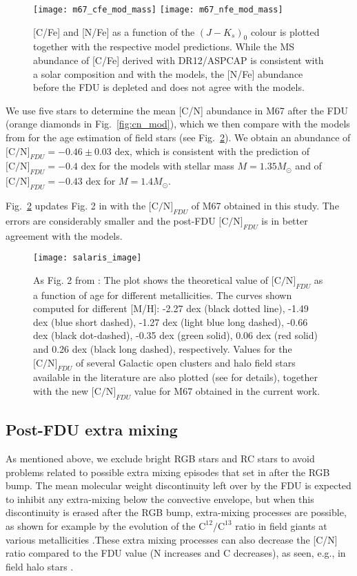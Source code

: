 \documentclass[a4paper,fleqn,usenatbib]{mnras}
\begin{document}
\begin{figure}
	\texttt{[image: m67\_cfe\_mod\_mass]}
	\texttt{[image: m67\_nfe\_mod\_mass]}
	\caption{[C/Fe] and [N/Fe] as a function of the $(J-K_s)_0$ colour is plotted together with the respective model predictions. While the MS abundance of [C/Fe] derived with DR12/ASPCAP is consistent with a solar composition and with the models, the [N/Fe] abundance before the FDU is depleted and does not agree with the models.}
	\label{fig:cn_mod_sep}
\end{figure}


We use five stars to determine the mean [C/N] abundance in M67 after the FDU (orange diamonds in Fig.~\ref{fig:cn_mod}), which we then compare with the models from \citet{salaris2015} for the age estimation of field stars (see Fig.~\ref{fig:sal_mod}). We obtain an abundance of $\text{[C/N]}_{FDU}=-0.46\pm 0.03$ dex, which is consistent with the prediction of $\text{[C/N]}_{FDU}=-0.4$ dex for the models with stellar mass $M=1.35M_{\odot}$ and of $\text{[C/N]}_{FDU}=-0.43$ dex for $M=1.4M_{\odot}$. 

Fig.~\ref{fig:sal_mod} updates Fig. 2 in \citet{salaris2015} with the $\text{[C/N]}_{FDU}$ of M67 obtained in this study. The errors are considerably smaller and the post-FDU $\text{[C/N]}_{FDU}$ is in better agreement with the models.

\begin{figure}
	\texttt{[image: salaris\_image]}
	\caption{As Fig. 2 from \citet{salaris2015}: The plot shows the theoretical value of $\text{[C/N]}_{FDU}$ as a function of age for different metallicities. The curves shown computed for different [M/H]: -2.27 dex (black dotted line), -1.49 dex (blue short dashed), -1.27 dex (light blue long dashed), -0.66 dex (black dot-dashed), -0.35 dex (green solid), 0.06 dex (red solid) and 0.26 dex (black long dashed), respectively. Values for the $\text{[C/N]}_{FDU}$ of several Galactic open clusters and halo field stars available in the literature are also plotted (see \citealt{salaris2015} for details), together with the new $\text{[C/N]}_{FDU}$ value for M67 obtained in the current work.}
	\label{fig:sal_mod}
\end{figure}


\subsection{Post-FDU extra mixing}
\label{sec:extra}

As mentioned above, we exclude bright RGB stars and RC stars to avoid problems related to possible extra mixing episodes that set in after the RGB bump. The mean molecular weight discontinuity left over by the FDU is expected to inhibit any extra-mixing below the convective envelope, but when this discontinuity is erased after the RGB bump, extra-mixing processes are possible, as shown for example by the evolution of the $\text{C}^{12}/\text{C}^{13}$ ratio in field giants at various metallicities \citep[][and references therein]{charbonnel2000}.These extra mixing processes can also decrease the [C/N] ratio compared to the FDU value (N increases
and C decreases), as seen, e.g., in field halo stars \citep{gratton2000}.
\end{document}
